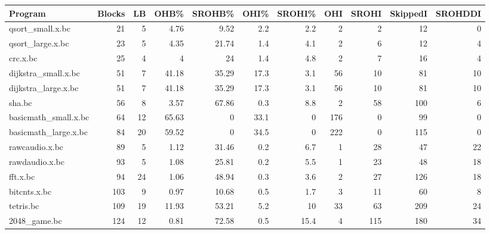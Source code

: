 \begin{tabular}{|l|r|r|r|r|r|r|r|r|r|r|}
\hline
 Program              &   Blocks &   LB &   OHB\% &   SROHB\% &   OHI\% &   SROHI\% &   OHI &   SROHI &   SkippedI &   SROHDDI \\
\hline
 qsort\_small.x.bc     &       21 &    5 &   4.76 &     9.52 &    2.2 &      2.2 &     2 &       2 &         12 &         0 \\
\hline
 qsort\_large.x.bc     &       23 &    5 &   4.35 &    21.74 &    1.4 &      4.1 &     2 &       6 &         12 &         4 \\
\hline
 crc.x.bc             &       25 &    4 &   4    &    24    &    1.4 &      4.8 &     2 &       7 &         16 &         4 \\
\hline
 dijkstra\_small.x.bc  &       51 &    7 &  41.18 &    35.29 &   17.3 &      3.1 &    56 &      10 &         81 &        10 \\
\hline
 dijkstra\_large.x.bc  &       51 &    7 &  41.18 &    35.29 &   17.3 &      3.1 &    56 &      10 &         81 &        10 \\
\hline
 sha.bc               &       56 &    8 &   3.57 &    67.86 &    0.3 &      8.8 &     2 &      58 &        100 &         6 \\
\hline
 basicmath\_small.x.bc &       64 &   12 &  65.63 &     0    &   33.1 &      0   &   176 &       0 &         99 &         0 \\
\hline
 basicmath\_large.x.bc &       84 &   20 &  59.52 &     0    &   34.5 &      0   &   222 &       0 &        115 &         0 \\
\hline
 rawcaudio.x.bc       &       89 &    5 &   1.12 &    31.46 &    0.2 &      6.7 &     1 &      28 &         47 &        22 \\
\hline
 rawdaudio.x.bc       &       93 &    5 &   1.08 &    25.81 &    0.2 &      5.5 &     1 &      23 &         48 &        18 \\
\hline
 fft.x.bc             &       94 &   24 &   1.06 &    48.94 &    0.3 &      3.6 &     2 &      27 &        126 &        18 \\
\hline
 bitcnts.x.bc         &      103 &    9 &   0.97 &    10.68 &    0.5 &      1.7 &     3 &      11 &         60 &         8 \\
\hline
 tetris.bc            &      109 &   19 &  11.93 &    53.21 &    5.2 &     10   &    33 &      63 &        209 &        24 \\
\hline
 2048\_game.bc         &      124 &   12 &   0.81 &    72.58 &    0.5 &     15.4 &     4 &     115 &        180 &        34 \\

\end{tabular}
